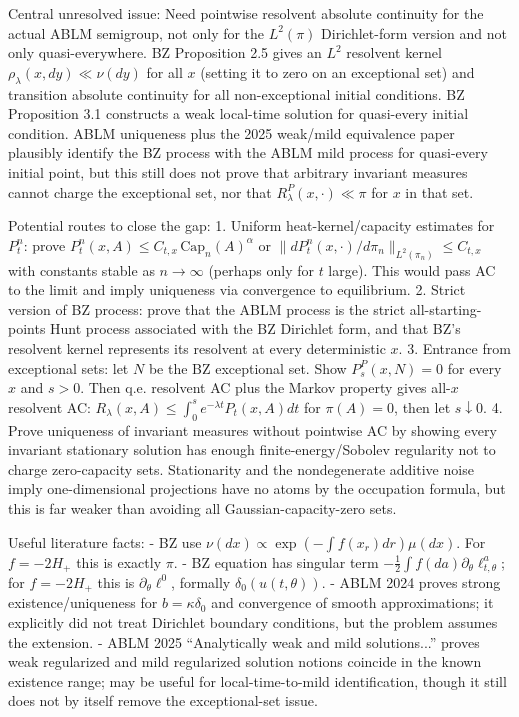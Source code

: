 \documentclass[12pt]{article}
\begin{document}
Central unresolved issue:
Need pointwise resolvent absolute continuity for the actual ABLM
semigroup, not only for the $L^2(\pi)$ Dirichlet-form version and not
only quasi-everywhere.  BZ Proposition 2.5 gives an $L^2$ resolvent kernel
$\rho_\lambda(x,dy)\ll\nu(dy)$ for all $x$ (setting it to zero on an
exceptional set) and transition absolute continuity for all
non-exceptional initial conditions.  BZ Proposition 3.1 constructs a
weak local-time solution for quasi-every initial condition.  ABLM
uniqueness plus the 2025 weak/mild equivalence paper plausibly identify
the BZ process with the ABLM mild process for quasi-every initial point,
but this still does not prove that arbitrary invariant measures cannot
charge the exceptional set, nor that $R_\lambda^P(x,\cdot)\ll\pi$ for
$x$ in that set.

Potential routes to close the gap:
1. Uniform heat-kernel/capacity estimates for $P_t^n$: prove
   $P_t^n(x,A)\le C_{t,x}\,\mathrm{Cap}_n(A)^\alpha$ or
   $\|dP_t^n(x,\cdot)/d\pi_n\|_{L^2(\pi_n)}\le C_{t,x}$ with constants
   stable as $n\to\infty$ (perhaps only for $t$ large).  This would pass
   AC to the limit and imply uniqueness via convergence to equilibrium.
2. Strict version of BZ process: prove that the ABLM process is the
   strict all-starting-points Hunt process associated with the BZ
   Dirichlet form, and that BZ's resolvent kernel represents its
   resolvent at every deterministic $x$.
3. Entrance from exceptional sets: let $N$ be the BZ exceptional set.
   Show $P_s^P(x,N)=0$ for every $x$ and $s>0$.  Then q.e. resolvent AC
   plus the Markov property gives all-$x$ resolvent AC:
   $R_\lambda(x,A)\le\int_0^s e^{-\lambda t}P_t(x,A)dt$ for
   $\pi(A)=0$, then let $s\downarrow0$.
4. Prove uniqueness of invariant measures without pointwise AC by showing
   every invariant stationary solution has enough finite-energy/Sobolev
   regularity not to charge zero-capacity sets.  Stationarity and the
   nondegenerate additive noise imply one-dimensional projections have no
   atoms by the occupation formula, but this is far weaker than avoiding
   all Gaussian-capacity-zero sets.

Useful literature facts:
- BZ use $\nu(dx)\propto \exp(-\int f(x_r)dr)\mu(dx)$.  For
  $f=-2H_+$ this is exactly $\pi$.
- BZ equation has singular term
  $-\frac12\int f(da)\partial_\theta\ell^a_{t,\theta}$; for
  $f=-2H_+$ this is $\partial_\theta\ell^0$, formally
  $\delta_0(u(t,\theta))$.
- ABLM 2024 proves strong existence/uniqueness for $b=\kappa\delta_0$
  and convergence of smooth approximations; it explicitly did not treat
  Dirichlet boundary conditions, but the problem assumes the extension.
- ABLM 2025 ``Analytically weak and mild solutions...'' proves weak
  regularized and mild regularized solution notions coincide in the
  known existence range; may be useful for local-time-to-mild
  identification, though it still does not by itself remove the
  exceptional-set issue.
\end{document}
